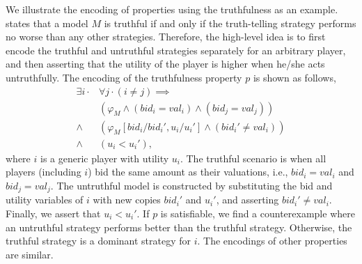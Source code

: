 We illustrate the encoding of properties using the truthfulness as an example.
 states that a model $M$ is truthful if and only if the truth-telling
strategy performs no worse than any other strategies.
Therefore, the high-level idea is to first encode the truthful and untruthful strategies separately
for an arbitrary player, and then asserting that the utility of the player is higher when he/she
acts untruthfully.
The encoding of the truthfulness property $p$ is shown as follows,%
\begin{align*}
\exists i \cdot & \forall j \cdot (i \neq j) \implies \\
& (\varphi_M \land (bid_i = val_i) \land (bid_j = val_j)) \tag{Truthful} \\
\land\; & (\varphi_M[bid_i/bid_i', u_i/u_i'] \land (bid_i' \neq val_i)) \tag{Untruthful} \\
\land\; & (u_i < u_i'), \tag{Utility}
\end{align*}%
where $i$ is a generic player with utility $u_i$.
The truthful scenario is when all players (including $i$) bid the same amount as their valuations,
i.e., $bid_i = val_i$ and $bid_j = val_j$.
The untruthful model is constructed by substituting the bid and utility variables of $i$ with new
copies $bid_i'$ and $u_i'$, and asserting $bid_i' \neq val_i$.
Finally, we assert that $u_i < u_i'$.
If $p$ is satisfiable, we find a counterexample where an untruthful strategy performs better than
the truthful strategy.
Otherwise, the truthful strategy is a dominant strategy for $i$.
The encodings of other properties are similar.


